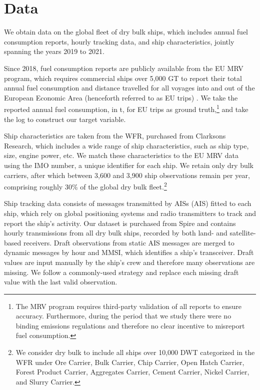 \section{Data}\label{sec:MLdata}
We obtain data on the global fleet of dry bulk ships, which includes annual fuel consumption reports, hourly tracking data, and ship characteristics, jointly spanning the years 2019 to 2021. 

Since 2018, fuel consumption reports are publicly available from the \ac{EU} \ac{MRV} program, which requires commercial ships over 5,000 \ac{GT} to report their total annual fuel consumption and distance travelled for all voyages into and out of the European Economic Area (henceforth referred to as EU trips) \parencite{eu2015regulation}. We take the reported annual fuel consumption, in \ac{t}, for \ac{EU} trips as ground truth,\footnote{The \ac{MRV} program requires third-party validation of all reports to ensure accuracy. Furthermore, during the period that we study there were no binding emissions regulations and therefore no clear incentive to misreport fuel consumption.} and take the log to construct our target variable. 

Ship characteristics are taken from the \ac{WFR}, purchased from Clarksons Research, which includes a wide range of ship characteristics, such as ship type, size, engine power, etc. We match these characteristics to the \ac{EU} \ac{MRV} data using the \ac{IMO} number, a unique identifier for each ship. We retain only dry bulk carriers, after which between 3,600 and 3,900 ship observations remain per year, comprising roughly 30\% of the global dry bulk fleet.\footnote{We consider dry bulk to include all ships over 10,000 \acs{DWT} categorized in the \acs{WFR} under Ore Carrier, Bulk Carrier, Chip Carrier, Open Hatch Carrier, Forest Product Carrier, Aggregates Carrier, Cement Carrier, Nickel Carrier, and Slurry Carrier.}


Ship tracking data consists of messages transmitted by \aclp{AIS} (\acs{AIS}) fitted to each ship, which rely on global positioning systems and radio transmitters to track and report the ship's activity. Our dataset is purchased from Spire and contains hourly transmissions from all dry bulk ships, recorded by both land- and satellite-based receivers. Draft observations from static \ac{AIS} messages are merged to dynamic messages by hour and \ac{MMSI}, which identifies a ship's transceiver. Draft values are input manually by the ship's crew and therefore many observations are missing. We follow a commonly-used strategy and replace each missing draft value with the last valid observation.

